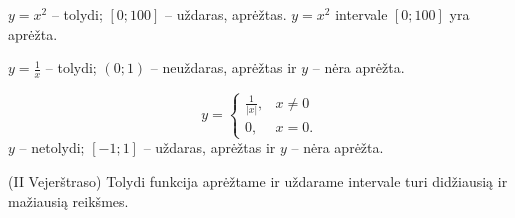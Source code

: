 \begin{exmp}
  $y = x^2$ – tolydi; $[0;100]$ – uždaras, aprėžtas. $y = x^2$ intervale
  $[0; 100]$ yra aprėžta.
\end{exmp}

\begin{exmp}
  $y = \frac{1}{x}$ – tolydi; $(0;1)$ – neuždaras, aprėžtas ir 
  $y$ – nėra aprėžta.
\end{exmp}

\begin{exmp}
  \begin{equation*}
    y = 
    \begin{cases}
      \frac{1}{|x|}, & x \neq 0 \\
      0, & x = 0.
    \end{cases}
  \end{equation*}
  $y$ – netolydi; $[-1;1]$ – uždaras, aprėžtas ir $y$ – nėra aprėžta.
\end{exmp}

\begin{prop}
  (II Vejerštraso) Tolydi funkcija aprėžtame ir uždarame intervale turi
  didžiausią ir mažiausią reikšmes.
\end{prop}

